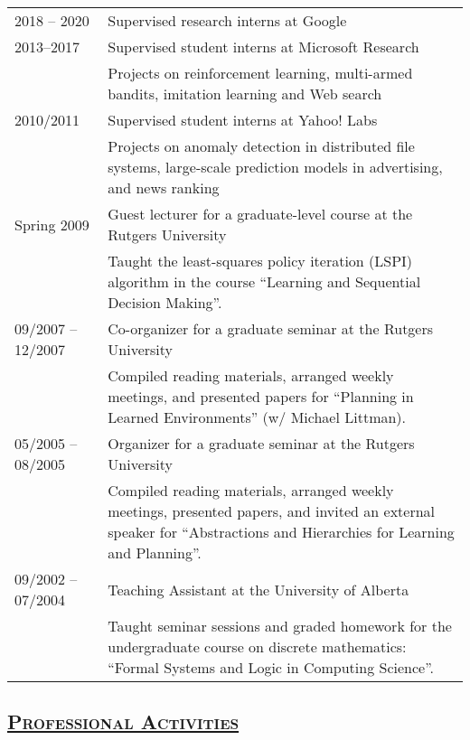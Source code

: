 \documentclass[10pt,twoside,letterpaper]{article}
\newcommand{\tabrowsep}{\vspace{1mm}}
\begin{document}
\begin{tabular}{p{30mm} p{120mm}}
2018 -- 2020 & Supervised research interns at Google \\
2013--2017 & Supervised student interns at Microsoft Research \\
                   & {\small\textmd{Projects on reinforcement learning, multi-armed bandits, imitation learning and Web search}} \\
2010/2011      & Supervised student interns at Yahoo! Labs \\
                   & {\small\textmd{Projects on anomaly detection in distributed file systems, large-scale prediction models in advertising, and news ranking}} \\
Spring 2009 & Guest lecturer for a graduate-level course at the Rutgers University \\
                   & {\small\textmd{Taught the least-squares policy iteration (LSPI) algorithm in the course ``Learning and Sequential Decision Making''.}} \\
09/2007 -- 12/2007 & Co-organizer for a graduate seminar at the Rutgers University \\
                   & {\small\textmd{Compiled reading materials, arranged weekly meetings, and presented papers for ``Planning in Learned Environments'' (w/ Michael Littman).}}\tabrowsep \\
05/2005 -- 08/2005 & Organizer for a graduate seminar at the Rutgers University \\
                   & {\small\textmd{Compiled reading materials, arranged weekly meetings, presented papers, and invited an external speaker for ``Abstractions and Hierarchies for Learning and Planning''.}}\tabrowsep \\
09/2002 -- 07/2004 & Teaching Assistant at the University of Alberta \\
                   & {\small\textmd{Taught seminar sessions and graded homework for the undergraduate course on discrete mathematics: ``Formal Systems and Logic in Computing Science''.}} %
\end{tabular}

\subsection*{\textsc{\underline{Professional Activities}}}
\end{document}
